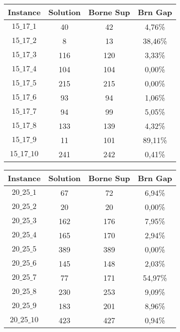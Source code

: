 \documentclass[a4paper, 11pt]{article} %
\begin{document}
\begin{center}
\begin{figure}[H]
   \begin{minipage}[c]{.46\linewidth}
      \begin{tabular}{|c|c|c|c|}
      \hline 
        Instance & Solution & Borne Sup & Brn Gap  \\ \hline
$15\_17\_1$ &  40 &  42 &  4,76\% \\ \hline
$15\_17\_2$ &  8 & 13 &  38,46\% \\ \hline
$15\_17\_3$ &  116 & 120 & 3,33\% \\ \hline
$15\_17\_4$ &  104 & 104 & 0,00\% \\ \hline
$15\_17\_5$ &  215 & 215 & 0,00\% \\ \hline
$15\_17\_6$ &  93 &  94 &  1,06\% \\ \hline
$15\_17\_7$ &  94 &  99 &  5,05\% \\ \hline
$15\_17\_8$ &  133 & 139 & 4,32\% \\ \hline
$15\_17\_9$ &  11 &  101 & 89,11\% \\ \hline
$15\_17\_10$ & 241 & 242 & 0,41\% \\ \hline
      \end{tabular}
   \end{minipage} \hfill
   \begin{minipage}[c]{.46\linewidth}
      \begin{tabular}{|c|c|c|c|}
      \hline 
        Instance & Solution & Borne Sup & Brn Gap  \\ \hline
$20\_25\_1$ &  67 &  72 &  6,94\% \\ \hline
$20\_25\_2$ &  20 &  20 &  0,00\% \\ \hline
$20\_25\_3$ &  162 & 176 & 7,95\% \\ \hline
$20\_25\_4$ &  165 & 170 & 2,94\% \\ \hline
$20\_25\_5$ &  389 & 389 & 0,00\% \\ \hline
$20\_25\_6$ &  145 & 148 & 2,03\% \\ \hline
$20\_25\_7$ &  77 &  171 & 54,97\% \\ \hline
$20\_25\_8$ &  230 & 253 & 9,09\% \\ \hline
$20\_25\_9$ &  183 & 201 & 8,96\% \\ \hline
$20\_25\_10$ & 423 & 427 & 0,94\% \\ \hline
      \end{tabular}
   \end{minipage}
\end{figure}


\end{center}
\end{document}

